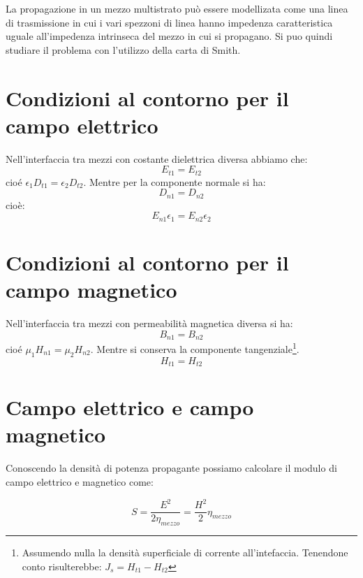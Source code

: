 \documentclass[10pt,a4paper]{report}
\begin{document}
		
		La propagazione in un mezzo multistrato può essere modellizata come una linea di trasmissione in cui i vari spezzoni di linea hanno impedenza caratteristica uguale all'impedenza intrinseca del mezzo in cui si propagano.	
		Si puo quindi studiare il problema con l'utilizzo della carta di Smith.

	\section{Condizioni al contorno per il campo elettrico}

		Nell'interfaccia tra mezzi con costante dielettrica diversa abbiamo che:
		\begin{equation}
		E_{t1}=E_{t2} 
		\end{equation}
		cioé $\epsilon_1 D_{t1} = \epsilon_2 D_{t2}$.
		Mentre per la componente normale si ha:
		\begin{equation}
		D_{n1} = D_{n2}
		\end{equation}
		cioè:
		\begin{equation}
		E_{n1}\epsilon_1=E_{n2}\epsilon_2
		\end{equation}

	\section{Condizioni al contorno per il campo magnetico}
		Nell'interfaccia tra mezzi con permeabilità magnetica diversa si ha:
		\begin{equation}
		B_{n1}=B_{n2} 
		\end{equation}
		cioé $\mu_1 H_{n1} = \mu_2 H_{n2}$.
		Mentre si conserva la componente tangenziale\footnote{Assumendo nulla la densità superficiale di corrente all'intefaccia. Tenendone conto risulterebbe: $J_s=H_{t1}-H_{t2}$}.
		\begin{equation}
		H_{t1}=H_{t2}
		\end{equation}

	\section{Campo elettrico e campo magnetico}

	Conoscendo la densità di potenza propagante possiamo calcolare il modulo di campo elettrico e magnetico come:

	\begin{equation}
	S=\frac{E^2}{2\eta_{mezzo}}=\frac{H^2}{2}\eta_{mezzo}
	\end{equation}
\end{document}
